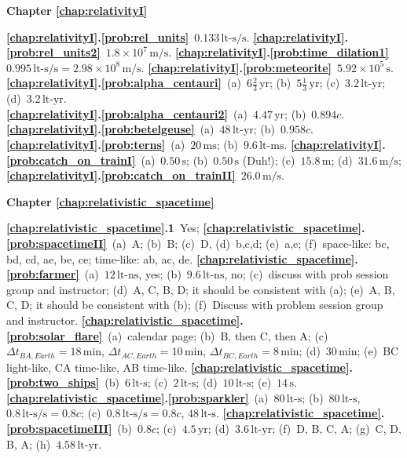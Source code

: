  \textbf{Chapter \ref{chap:relativityI}}

 
\textbf{\ref{chap:relativityI}.\ref{prob:rel_units}}~$0.133\,\text{lt-s/s}$.  
\textbf{\ref{chap:relativityI}.\ref{prob:rel_units2}}~$1.8\times 10^7\,\text{m/s}$.  
\textbf{\ref{chap:relativityI}.\ref{prob:time_dilation1}}~$0.995\,\text{lt-s/s} 
= 2.98\times 10^8\,\text{m/s}$.  
\textbf{\ref{chap:relativityI}.\ref{prob:meteorite}}~$5.92\times 10^5\,\text{s}$.
\textbf{\ref{chap:relativityI}.\ref{prob:alpha_centauri}}~(a)~$6\frac{2}{3}
\,\text{yr}$; (b)~$5\frac{1}{3}\,\text{yr}$; 
(c)~$3.2\,\text{lt-yr}$; (d)~$3.2\,\text{lt-yr}$.\\ 
\textbf{\ref{chap:relativityI}.\ref{prob:alpha_centauri2}}~(a)~$4.47\,\text{yr}$; 
(b)~$0.894c$. 
\textbf{\ref{chap:relativityI}.\ref{prob:betelgeuse}}~(a)~$48\,\text{lt-yr}$; 
(b)~$0.958c$.
\textbf{\ref{chap:relativityI}.\ref{prob:terns}}~(a)~$20\,\text{ms}$; 
(b)~$9.6\,\text{lt-ms}$. 
\textbf{\ref{chap:relativityI}.\ref{prob:catch_on_trainI}}~(a)~$0.50\,\text{s}$;
(b)~$0.50\,\text{s}$ (Duh!); (c)~$15.8\,\text{m}$; (d)~$31.6\,\text{m/s}$;
\textbf{\ref{chap:relativityI}.\ref{prob:catch_on_trainII}}~$26.0\,\text{m/s}$.


 \textbf{Chapter \ref{chap:relativistic_spacetime}}


\textbf{\ref{chap:relativistic_spacetime}.1}~Yes;
\textbf{\ref{chap:relativistic_spacetime}.\ref{prob:spacetimeII}}~(a)~A; 
(b)~B; (c)~D, (d)~b,c,d; (e)~a,e; (f)~space-like: bc, bd, cd, ae, be, ce; 
time-like: ab, ac, de.
\textbf{\ref{chap:relativistic_spacetime}.\ref{prob:farmer}}~(a)~$12\,\text{lt-ns}$, yes;
(b)~$9.6\,\text{lt-ns}$, no; (c)~discuss with prob session group and instructor; 
(d)~A, C, B, D; it should be consistent with (a);
(e)~A, B, C, D; it should be consistent with (b);
(f)~Discuss with problem session group and instructor.
\textbf{\ref{chap:relativistic_spacetime}.\ref{prob:solar_flare}}~(a)~calendar 
page; (b)~B, then C, then A; (c)~$\Delta t_{ BA,Earth} = 18\,\text{min}$, 
$\Delta t_{ AC,Earth} = 10\,\text{min}$, $\Delta t_{ BC,Earth} = 
8\,\text{min}$; 
(d)~$30\,\text{min}$; 
(e)~BC light-like, CA time-like, AB time-like. 
\textbf{\ref{chap:relativistic_spacetime}.\ref{prob:two_ships}}~(b)~$6\,\text{lt-s}$; (c)~$2\,\text{lt-s}$; (d)~$10\,\text{lt-s}$;
(e)~$14\,\text{s}$.
\textbf{\ref{chap:relativistic_spacetime}.\ref{prob:sparkler}}~(a)~$80\,\text{lt-s}$; 
(b)~$80\,\text{lt-s}$, $0.8\,\text{lt-s/s}=0.8c$; 
(c)~$0.8\,\text{lt-s/s}=0.8c$, $48\,\text{lt-s}$.
\textbf{\ref{chap:relativistic_spacetime}.\ref{prob:spacetimeIII}}~(b)~$0.8c$; 
(c)~$4.5\,\text{yr}$; 
(d)~$3.6\,\text{lt-yr}$; (f)~D, B, C, A; (g)~C, D, B, A; 
(h)~$4.58\,\text{lt-yr}$.



